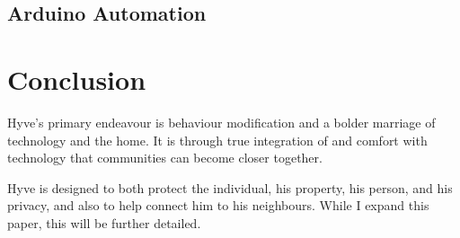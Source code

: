 \begin{multicols}{2}
	\subsection{Arduino Automation}
		
\section{Conclusion}

	Hyve's primary endeavour is behaviour modification and a bolder marriage of technology and the home.
	It is through true integration of and comfort with technology that communities can become closer together.
	
	Hyve is designed to both protect the individual, his property, his person, and his privacy, and also to help connect him to his neighbours.
	While I expand this paper, this will be further detailed.

\end{multicols}
